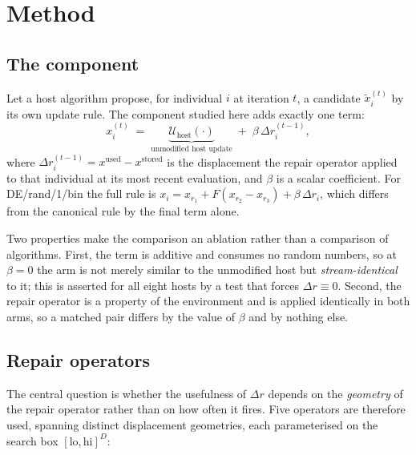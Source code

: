 \section{Method}
\label{sec:method}

\subsection{The component}

Let a host algorithm propose, for individual $i$ at iteration $t$, a candidate
$\tilde{x}_i^{(t)}$ by its own update rule. The component studied here adds
exactly one term:
%
\begin{equation}
  x_i^{(t)} \;=\; \underbrace{\mathcal{U}_{\text{host}}\!\left(\cdot\right)}_{\text{unmodified host update}}
  \;+\; \beta\,\Delta r_i^{(t-1)},
  \label{eq:component}
\end{equation}
%
where $\Delta r_i^{(t-1)} = x^{\text{used}} - x^{\text{stored}}$ is the displacement
the repair operator applied to that individual at its most recent evaluation, and
$\beta$ is a scalar coefficient. For DE/rand/1/bin the full rule is
$x_i = x_{r_1} + F(x_{r_2}-x_{r_3}) + \beta\,\Delta r_i$, which differs from the
canonical rule by the final term alone.

Two properties make the comparison an ablation rather than a comparison of
algorithms. First, the term is additive and consumes no random numbers, so at
$\beta=0$ the arm is not merely similar to the unmodified host but
\emph{stream-identical} to it; this is asserted for all eight hosts by a test
that forces $\Delta r \equiv 0$. Second, the repair operator is a property of the
environment and is applied identically in both arms, so a matched pair differs by
the value of $\beta$ and by nothing else.

\subsection{Repair operators}

The central question is whether the usefulness of $\Delta r$ depends on the
\emph{geometry} of the repair operator rather than on how often it fires. Five
operators are therefore used, spanning distinct displacement geometries, each
parameterised on the search box $[\text{lo},\text{hi}]^D$:

